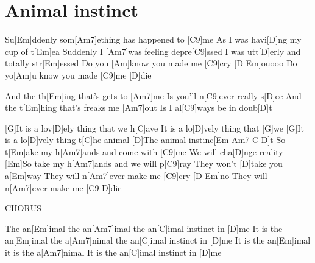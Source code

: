 \section{Animal instinct}
\begin{guitar}
\begin{multicols}{2}
  Su[Em]ddenly som[Am7]ething has happened to [C9]me
  As I was havi[D]ng my cup of t[Em]ea
  Suddenly I [Am7]was feeling depre[C9]ssed
  I was utt[D]erly and totally str[Em]essed
  Do you [Am]know you made me [C9]cry [D Em]ouooo
  Do yo[Am]u know you made [C9]me [D]die


  And the th[Em]ing that's gets to [Am7]me
  Is you'll n[C9]ever really s[D]ee
  And the t[Em]hing that's freaks me [Am7]out
  Is I al[C9]ways be in doub[D]t

  
  [G]It is a lov[D]ely thing that we h[C]ave
  It is a lo[D]vely thing that [G]we
  [G]It is a lo[D]vely thing t[C]he animal
  [D]The animal instinc[Em Am7 C D]t
  So t[Em]ake my h[Am7]ands and come with [C9]me
  We will cha[D]nge reality
  [Em]So take my h[Am7]ands and we will p[C9]ray
  They won't [D]take you a[Em]way
  They will n[Am7]ever make me [C9]cry [D Em]no
  They will n[Am7]ever make me [C9 D]die 


  CHORUS


  The an[Em]imal the an[Am7]imal the an[C]imal instinct in [D]me
  It is the an[Em]imal the a[Am7]nimal the an[C]imal instinct in [D]me
  It is the an[Em]imal it is the a[Am7]nimal
  It is the an[C]imal instinct in [D]me
\end{multicols}
\end{guitar}
